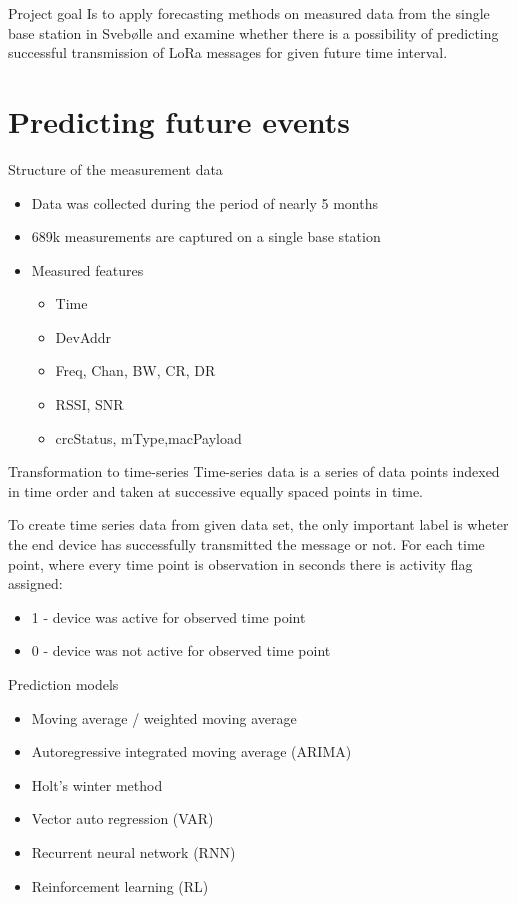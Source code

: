 \documentclass{beamer}
\begin{document}
  \begin{frame}{Project goal}
    Is to apply forecasting methods on measured data from the single base station in Svebølle and examine whether there is a possibility of predicting \alert{successful transmission of LoRa messages for given future time interval}.
  \end{frame}

  \section{Predicting future events}
  \begin{frame}{Structure of the measurement data}
    \begin{itemize}
      \item Data was collected during the period of nearly 5 months
      \item 689k measurements are captured on a single base station
      \item Measured features\begin{itemize}
        \item Time
        \item DevAddr
        \item Freq, Chan, BW, CR, DR 
        \item RSSI, SNR  
        \item crcStatus, mType,macPayload 
      \end{itemize}
    \end{itemize}
  \end{frame}

  \begin{frame}{Transformation to time-series}
    \alert{Time-series} data is a series of data points indexed in time order and taken at successive equally spaced points in time.

    To create time series data from given data set, the only important label is wheter the end device has successfully transmitted the message or not. For each time point, where every time point is observation in seconds there is activity flag assigned:
    \begin{itemize}
      \item 1 - device was active for observed time point
      \item 0 - device was not active for observed time point
    \end{itemize}
  \end{frame}

  \begin{frame}{Prediction models}
    \begin{itemize}
      \item Moving average / weighted moving average
      \item Autoregressive integrated moving average (ARIMA)
      \item Holt's winter method
      \item Vector auto regression (VAR)
      \item \alert{Recurrent neural network (RNN)}
      \item Reinforcement learning (RL)
    \end{itemize}
  \end{frame}
\end{document}
